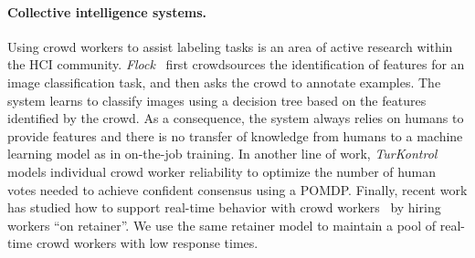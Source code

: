 
\paragraph{Collective intelligence systems.}
Using crowd workers to assist labeling tasks is an area of active research within the HCI community.
\textit{Flock}~\cite{cheng2015flock} first crowdsources the identification of features for an image classification task, and then asks the crowd to annotate examples.
The system learns to classify images using a decision tree based on the features identified by the crowd.
As a consequence, the system always relies on humans to provide features and there is no transfer of knowledge from humans to a machine learning model as in on-the-job training.
In another line of work, \textit{TurKontrol}~\cite{dai2010decision} models individual crowd worker reliability to optimize the number of human votes needed to achieve confident consensus using a POMDP\@.
Finally, recent work has studied how to support real-time behavior with crowd workers~\cite{bernstein2011crowds,lasecki2013real} by hiring workers ``on retainer''.
We use the same retainer model to maintain a pool of real-time crowd workers with low response times.


